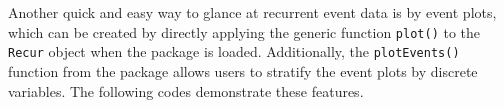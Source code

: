 Another quick and easy way to glance at recurrent event data is by event
plots, which can be created by directly applying the generic function
\texttt{plot()} to the \texttt{Recur} object when the 
package is loaded. Additionally, the \texttt{plotEvents()} function from
the  package allows users to stratify the event plots by
discrete variables. The following codes demonstrate these features.

\begin{Shaded}
\end{Shaded}

